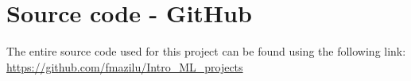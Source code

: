 \section{Source code - GitHub}

The entire source code used for this project can be found using the following link: \url{https://github.com/fmazilu/Intro_ML_projects}